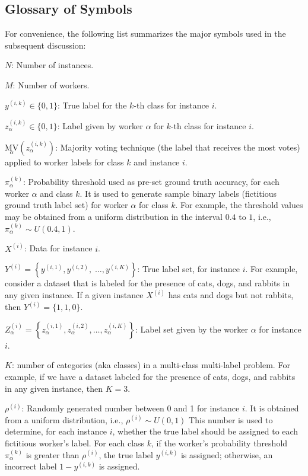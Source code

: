 \documentclass[default]{bst/sn-jnl_mine}%
\begin{document}
\subsection{Glossary of Symbols}
For convenience, the following list summarizes the major symbols used in the subsequent discussion:
\begin{itemize}{
    \setlength{\parindent}{1.5em}
    \item  $N$: Number of instances.
    \item  $M$: Number of workers.
    \item  $y^{(i,k)} \in \{0,1\} $: True label for the $k $-th class for instance $i $.
    \item  $z_\alpha^{(i,k)} \in \{0,1\} $: Label given by worker $\alpha $ for $k $-th class for instance $i $.
    \item  ${{\underset\alpha{\mathrm{MV}}}{\left(z_\alpha^{(i,k)}\right)}} $: Majority voting technique (the label that receives the most votes) applied to worker labels for class $k $ and instance $i $.
    \item  $\pi_\alpha^{(k)} $: Probability threshold used as pre-set ground truth accuracy, for each worker $\alpha$ and class $k$. It is used to generate sample binary labels (fictitious ground truth label set) for worker $\alpha $ for class $k $. For example, the threshold values may be obtained from a uniform distribution in the interval $0.4 $ to $1 $, i.e., $\pi_\alpha^{(k)} \sim U(0.4,1) $.
    \item  $X^{(i)} $: Data for instance $i$.
    \item  $Y^{(i)}=\left\{y^{(i,1)},y^{(i,2)},\;\dots,y^{(i,K)}\right\} $: True label set, for instance $i $. For example, consider a dataset that is labeled for the presence of cats, dogs, and rabbits in any given instance. If a given instance $X^{(i)} $ has cats and dogs but not rabbits, then $Y^{(i)}=\{1,1,0\} $.
    \item  $Z_{\alpha}^{(i)}=\left\{z_\alpha^{(i,1)}, z_\alpha^{(i,2)}, \dots, z_\alpha^{(i,K)}\right\} $: Label set given by the worker $\alpha $ for instance $i $.
    \item $K$: number of categories (aka classes) in a multi-class multi-label problem. For example, if we have a dataset labeled for the presence of cats, dogs, and rabbits in any given instance, then $K=3$.
    \item  $\rho^{(i)}$: Randomly generated number  between 0 and 1 for instance $i $. It is obtained from a uniform distribution, i.e., $\rho^{(i)} \sim U(0,1) $ This number is used to determine, for each instance $i$, whether the true label should be assigned to each fictitious worker's label. For each class $k$, if the worker's probability threshold $\pi_\alpha^{(k)}$ is greater than $\rho^{(i)}$, the true label $y^{(i,k)}$ is assigned; otherwise, an incorrect label $1 - y^{(i,k)}$  is assigned.
}
\end{itemize}
\end{document}

